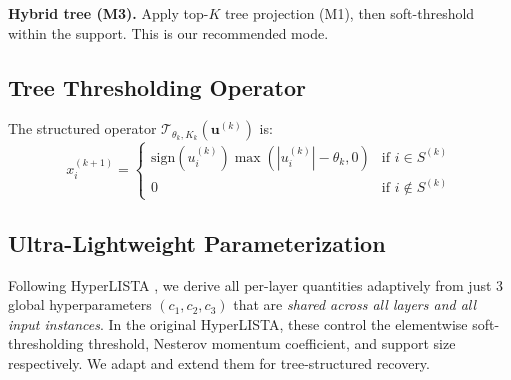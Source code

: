 \documentclass{article}
\begin{document}
\textbf{Hybrid tree (M3).} Apply top-$K$ tree projection (M1), then soft-threshold within the support. This is our recommended mode.

\subsection{Tree Thresholding Operator}

The structured operator $\mathcal{T}_{\theta_k, K_k}(\mathbf{u}^{(k)})$ is:
\begin{equation}
    x_i^{(k+1)} = \begin{cases}
        \mathrm{sign}(u_i^{(k)}) \max(|u_i^{(k)}| - \theta_k, 0) & \text{if } i \in S^{(k)} \\
        0 & \text{if } i \notin S^{(k)}
    \end{cases} \label{eq:operator}
\end{equation}

\subsection{Ultra-Lightweight Parameterization}

Following HyperLISTA \cite{chen2021hyperlista}, we derive all per-layer quantities adaptively from just 3 global hyperparameters $(c_1, c_2, c_3)$ that are \emph{shared across all layers and all input instances}. In the original HyperLISTA, these control the elementwise soft-thresholding threshold, Nesterov momentum coefficient, and support size respectively. We adapt and extend them for tree-structured recovery.
\end{document}
